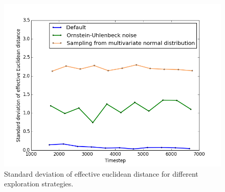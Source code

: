 \documentclass{article}
\begin{document}

\begin{figure}
\begin{center}
\includegraphics[scale=0.35]{action_exploration_std_dev}
\end{center}
\caption{Standard deviation of effective euclidean distance for different exploration strategies.}
\label{fig:action_exploration_std_dev}
\end{figure}
\end{document}
